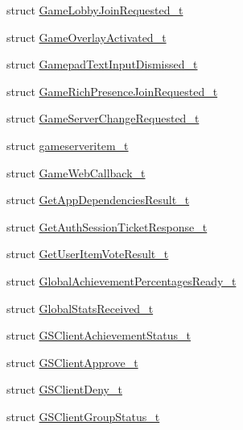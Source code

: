 \begin{DoxyCompactItemize}
struct \hyperlink{struct_valve_1_1_steamworks_1_1_game_lobby_join_requested__t}{Game\+Lobby\+Join\+Requested\+\_\+t}
\item 
struct \hyperlink{struct_valve_1_1_steamworks_1_1_game_overlay_activated__t}{Game\+Overlay\+Activated\+\_\+t}
\item 
struct \hyperlink{struct_valve_1_1_steamworks_1_1_gamepad_text_input_dismissed__t}{Gamepad\+Text\+Input\+Dismissed\+\_\+t}
\item 
struct \hyperlink{struct_valve_1_1_steamworks_1_1_game_rich_presence_join_requested__t}{Game\+Rich\+Presence\+Join\+Requested\+\_\+t}
\item 
struct \hyperlink{struct_valve_1_1_steamworks_1_1_game_server_change_requested__t}{Game\+Server\+Change\+Requested\+\_\+t}
\item 
struct \hyperlink{struct_valve_1_1_steamworks_1_1gameserveritem__t}{gameserveritem\+\_\+t}
\item 
struct \hyperlink{struct_valve_1_1_steamworks_1_1_game_web_callback__t}{Game\+Web\+Callback\+\_\+t}
\item 
struct \hyperlink{struct_valve_1_1_steamworks_1_1_get_app_dependencies_result__t}{Get\+App\+Dependencies\+Result\+\_\+t}
\item 
struct \hyperlink{struct_valve_1_1_steamworks_1_1_get_auth_session_ticket_response__t}{Get\+Auth\+Session\+Ticket\+Response\+\_\+t}
\item 
struct \hyperlink{struct_valve_1_1_steamworks_1_1_get_user_item_vote_result__t}{Get\+User\+Item\+Vote\+Result\+\_\+t}
\item 
struct \hyperlink{struct_valve_1_1_steamworks_1_1_global_achievement_percentages_ready__t}{Global\+Achievement\+Percentages\+Ready\+\_\+t}
\item 
struct \hyperlink{struct_valve_1_1_steamworks_1_1_global_stats_received__t}{Global\+Stats\+Received\+\_\+t}
\item 
struct \hyperlink{struct_valve_1_1_steamworks_1_1_g_s_client_achievement_status__t}{G\+S\+Client\+Achievement\+Status\+\_\+t}
\item 
struct \hyperlink{struct_valve_1_1_steamworks_1_1_g_s_client_approve__t}{G\+S\+Client\+Approve\+\_\+t}
\item 
struct \hyperlink{struct_valve_1_1_steamworks_1_1_g_s_client_deny__t}{G\+S\+Client\+Deny\+\_\+t}
\item 
struct \hyperlink{struct_valve_1_1_steamworks_1_1_g_s_client_group_status__t}{G\+S\+Client\+Group\+Status\+\_\+t}
\item 

\end{DoxyCompactItemize}
